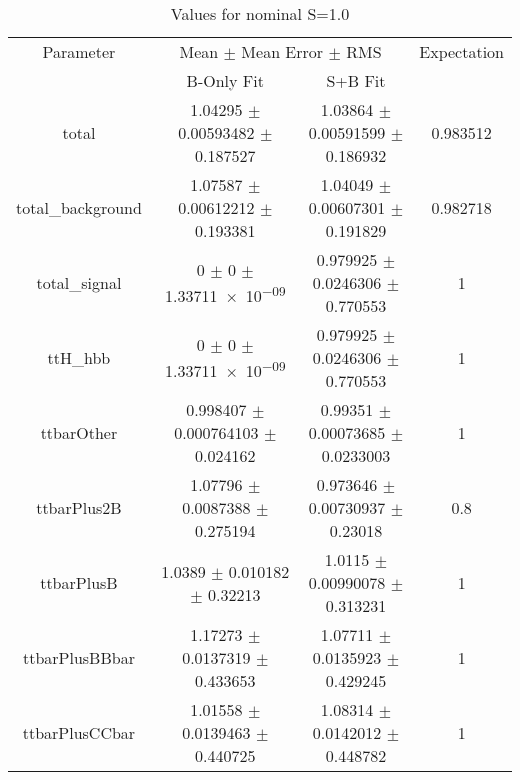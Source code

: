 \begin{table}
\centering
\caption{Values for nominal S=1.0}
\begin{tabular}{cccc}
\toprule
Parameter & \multicolumn{2}{c}{Mean $\pm$ Mean Error $\pm$ RMS} & Expectation\\
 & B-Only Fit & S+B Fit & \\
\midrule
total & \num{1.04295} $\pm$ \num{0.00593482} $\pm$ \num{0.187527} & \num{1.03864} $\pm$ \num{0.00591599} $\pm$ \num{0.186932} & \num{0.983512}\\
total\_background & \num{1.07587} $\pm$ \num{0.00612212} $\pm$ \num{0.193381} & \num{1.04049} $\pm$ \num{0.00607301} $\pm$ \num{0.191829} & \num{0.982718}\\
total\_signal & \num{0} $\pm$ \num{0} $\pm$ \num{1.33711e-09} & \num{0.979925} $\pm$ \num{0.0246306} $\pm$ \num{0.770553} & \num{1}\\
ttH\_hbb & \num{0} $\pm$ \num{0} $\pm$ \num{1.33711e-09} & \num{0.979925} $\pm$ \num{0.0246306} $\pm$ \num{0.770553} & \num{1}\\
ttbarOther & \num{0.998407} $\pm$ \num{0.000764103} $\pm$ \num{0.024162} & \num{0.99351} $\pm$ \num{0.00073685} $\pm$ \num{0.0233003} & \num{1}\\
ttbarPlus2B & \num{1.07796} $\pm$ \num{0.0087388} $\pm$ \num{0.275194} & \num{0.973646} $\pm$ \num{0.00730937} $\pm$ \num{0.23018} & \num{0.8}\\
ttbarPlusB & \num{1.0389} $\pm$ \num{0.010182} $\pm$ \num{0.32213} & \num{1.0115} $\pm$ \num{0.00990078} $\pm$ \num{0.313231} & \num{1}\\
ttbarPlusBBbar & \num{1.17273} $\pm$ \num{0.0137319} $\pm$ \num{0.433653} & \num{1.07711} $\pm$ \num{0.0135923} $\pm$ \num{0.429245} & \num{1}\\
ttbarPlusCCbar & \num{1.01558} $\pm$ \num{0.0139463} $\pm$ \num{0.440725} & \num{1.08314} $\pm$ \num{0.0142012} $\pm$ \num{0.448782} & \num{1}\\
\bottomrule
\end{tabular}
\end{table}